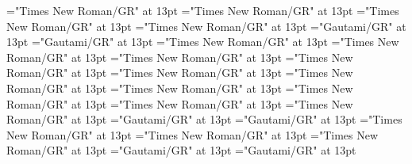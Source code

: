 \documentclass[a4paper]{article}
\begin{document}
\font\spanenCmPossibilitypublishStemTransTypeAbbreviationPubenspanspanspansensespanentryletDatadicBody="Times New Roman/GR" at 13pt
\font\CmPossibilitypublishStemTransTypeNamePubenspanspanspansensespanentryletDatadicBody="Times New Roman/GR" at 13pt
\font\spanenCmPossibilitypublishStemTransTypeNamePubenspanspanspansensespanentryletDatadicBody="Times New Roman/GR" at 13pt
\font\spanenspanspanspansensespanentryletDatadicBody="Times New Roman/GR" at 13pt
\font\translationLdtespanspansensespanentryletDatadicBody="Gautami/GR" at 13pt
\font\spantetranslationLdtespanspansensespanentryletDatadicBody="Gautami/GR" at 13pt
\font\spanentranslationLdtespanspansensespanentryletDatadicBody="Times New Roman/GR" at 13pt
\font\spanenspansensespanentryletDatadicBody="Times New Roman/GR" at 13pt
\font\semanticdomainabbrenspansensespanentryletDatadicBody="Times New Roman/GR" at 13pt
\font\spanensemanticdomainabbrenspansensespanentryletDatadicBody="Times New Roman/GR" at 13pt
\font\semanticdomainnameenspansensespanentryletDatadicBody="Times New Roman/GR" at 13pt
\font\spanensemanticdomainnameenspansensespanentryletDatadicBody="Times New Roman/GR" at 13pt
\font{}="Times New Roman/GR" at 13pt
\font\xitemendefinitionLdensensespanentryletDatadicBody="Times New Roman/GR" at 13pt
\font\spanenxitemendefinitionLdensensespanentryletDatadicBody="Times New Roman/GR" at 13pt
\font\spanendefinitionLdensensespanentryletDatadicBody="Times New Roman/GR" at 13pt
\font\xitemtedefinitionLdensensespanentryletDatadicBody="Gautami/GR" at 13pt
\font\spantexitemtedefinitionLdensensespanentryletDatadicBody="Gautami/GR" at 13pt
\font\LexSensepublishStemGlossPubLdensensespanentryletDatadicBody="Times New Roman/GR" at 13pt
\font\xitemenLexSensepublishStemGlossPubLdensensespanentryletDatadicBody="Times New Roman/GR" at 13pt
\font\spanenxitemenLexSensepublishStemGlossPubLdensensespanentryletDatadicBody="Times New Roman/GR" at 13pt
\font\xitemteLexSensepublishStemGlossPubLdensensespanentryletDatadicBody="Gautami/GR" at 13pt
\font\spantexitemteLexSensepublishStemGlossPubLdensensespanentryletDatadicBody="Gautami/GR" at 13pt
\end{document}
